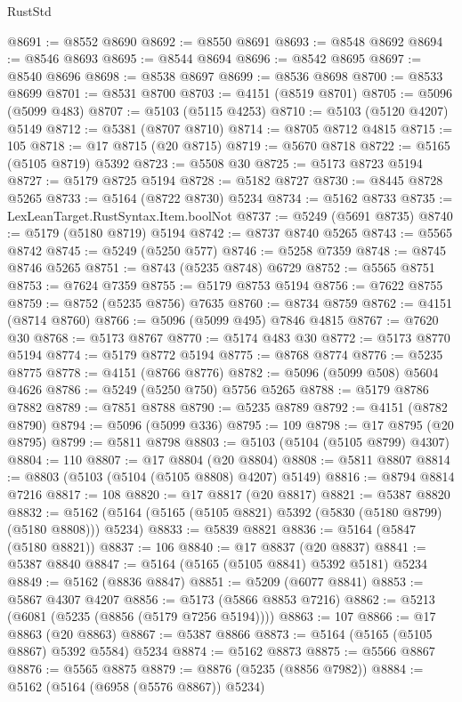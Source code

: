 \begin{lexlean}{RustStd}
\begin{coremodule}
@8691 := @8552 @8690
@8692 := @8550 @8691
@8693 := @8548 @8692
@8694 := @8546 @8693
@8695 := @8544 @8694
@8696 := @8542 @8695
@8697 := @8540 @8696
@8698 := @8538 @8697
@8699 := @8536 @8698
@8700 := @8533 @8699
@8701 := @8531 @8700
@8703 := @4151 (@8519 @8701)
@8705 := @5096 (@5099 @483)
@8707 := @5103 (@5115 @4253)
@8710 := @5103 (@5120 @4207) @5149
@8712 := @5381 (@8707 @8710)
@8714 := @8705 @8712 @4815
@8715 := 105
@8718 := @17 @8715 (@20 @8715)
@8719 := @5670 @8718
@8722 := @5165 (@5105 @8719) @5392
@8723 := @5508 @30
@8725 := @5173 @8723 @5194
@8727 := @5179 @8725 @5194
@8728 := @5182 @8727
@8730 := @8445 @8728 @5265
@8733 := @5164 (@8722 @8730) @5234
@8734 := @5162 @8733
@8735 := LexLeanTarget.RustSyntax.Item.boolNot
@8737 := @5249 (@5691 @8735)
@8740 := @5179 (@5180 @8719) @5194
@8742 := @8737 @8740 @5265
@8743 := @5565 @8742
@8745 := @5249 (@5250 @577)
@8746 := @5258 @7359
@8748 := @8745 @8746 @5265
@8751 := @8743 (@5235 @8748) @6729
@8752 := @5565 @8751
@8753 := @7624 @7359
@8755 := @5179 @8753 @5194
@8756 := @7622 @8755
@8759 := @8752 (@5235 @8756) @7635
@8760 := @8734 @8759
@8762 := @4151 (@8714 @8760)
@8766 := @5096 (@5099 @495) @7846 @4815
@8767 := @7620 @30
@8768 := @5173 @8767
@8770 := @5174 @483 @30
@8772 := @5173 @8770 @5194
@8774 := @5179 @8772 @5194
@8775 := @8768 @8774
@8776 := @5235 @8775
@8778 := @4151 (@8766 @8776)
@8782 := @5096 (@5099 @508) @5604 @4626
@8786 := @5249 (@5250 @750) @5756 @5265
@8788 := @5179 @8786 @7882
@8789 := @7851 @8788
@8790 := @5235 @8789
@8792 := @4151 (@8782 @8790)
@8794 := @5096 (@5099 @336)
@8795 := 109
@8798 := @17 @8795 (@20 @8795)
@8799 := @5811 @8798
@8803 := @5103 (@5104 (@5105 @8799) @4307)
@8804 := 110
@8807 := @17 @8804 (@20 @8804)
@8808 := @5811 @8807
@8814 := @8803 (@5103 (@5104 (@5105 @8808) @4207) @5149)
@8816 := @8794 @8814 @7216
@8817 := 108
@8820 := @17 @8817 (@20 @8817)
@8821 := @5387 @8820
@8832 := @5162 (@5164 (@5165 (@5105 @8821) @5392 (@5830 (@5180 @8799) (@5180 @8808))) @5234)
@8833 := @5839 @8821
@8836 := @5164 (@5847 (@5180 @8821))
@8837 := 106
@8840 := @17 @8837 (@20 @8837)
@8841 := @5387 @8840
@8847 := @5164 (@5165 (@5105 @8841) @5392 @5181) @5234
@8849 := @5162 (@8836 @8847)
@8851 := @5209 (@6077 @8841)
@8853 := @5867 @4307 @4207
@8856 := @5173 (@5866 @8853 @7216)
@8862 := @5213 (@6081 (@5235 (@8856 (@5179 @7256 @5194))))
@8863 := 107
@8866 := @17 @8863 (@20 @8863)
@8867 := @5387 @8866
@8873 := @5164 (@5165 (@5105 @8867) @5392 @5584) @5234
@8874 := @5162 @8873
@8875 := @5566 @8867
@8876 := @5565 @8875
@8879 := @8876 (@5235 (@8856 @7982))
@8884 := @5162 (@5164 (@6958 (@5576 @8867)) @5234)

\end{coremodule}
\end{lexlean}
